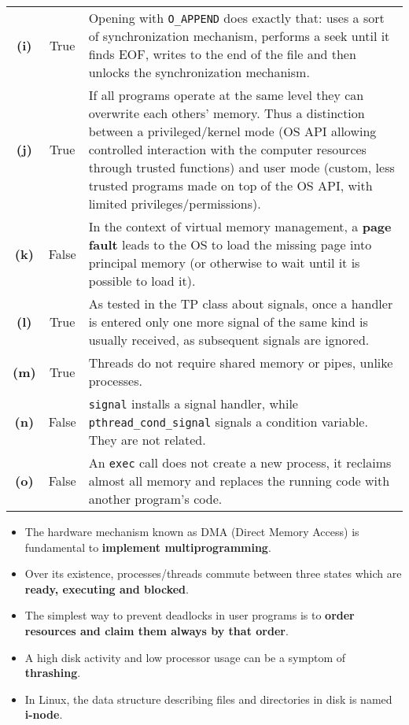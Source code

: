 \documentclass{sope}
\begin{document}
\begin{center}
\begin{longtable}{c | c p{132mm}}
        \textbf{(i)} & True & Opening with \texttt{O\_APPEND} does exactly that: uses a sort of synchronization mechanism, performs a seek until it finds EOF, writes to the end of the file and then unlocks the synchronization mechanism. \\
        \textbf{(j)} & True & If all programs operate at the same level they can overwrite each others' memory. Thus a distinction between a privileged/kernel mode (OS API allowing controlled interaction with the computer resources through trusted functions) and user mode (custom, less trusted programs made on top of the OS API, with limited privileges/permissions). \\
        \textbf{(k)} & False & In the context of virtual memory management, a \textbf{page fault} leads to the OS to load the missing page into principal memory (or otherwise to wait until it is possible to load it). \\
        \textbf{(l)} & True & As tested in the TP class about signals, once a handler is entered only one more signal of the same kind is usually received, as subsequent signals are ignored. \\
        \textbf{(m)} & True & Threads do not require shared memory or pipes, unlike processes. \\
        \textbf{(n)} & False & \texttt{signal} installs a signal handler, while \texttt{pthread\_cond\_signal} signals a condition variable. They are not related. \\
        \textbf{(o)} & False & An \texttt{exec} call does not create a new process, it reclaims almost all memory and replaces the running code with another program's code.
    \end{longtable}
\end{center}

\begin{itemize}
    \item The hardware mechanism known as DMA (Direct Memory Access) is fundamental to \textbf{implement multiprogramming}.
    \item Over its existence, processes/threads commute between three states which are \textbf{ready, executing and blocked}.
    \item The simplest way to prevent deadlocks in user programs is to \textbf{order resources and claim them always by that order}.
    \item A high disk activity and low processor usage can be a symptom of \textbf{thrashing}.
    \item In Linux, the data structure describing files and directories in disk is named \textbf{i-node}.
\end{itemize}
\end{document}
